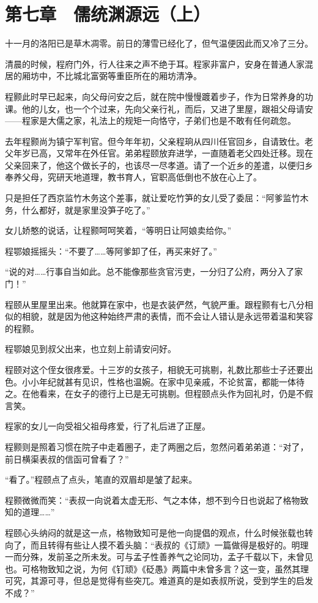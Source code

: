 \section{第七章　儒统渊源远（上）}

十一月的洛阳已是草木凋零。前日的薄雪已经化了，但气温便因此而又冷了三分。

清晨的时候，程府门外，行人往来之声不绝于耳。程家非富户，安身在普通人家混居的厢坊中，不比城北富弼等重臣所在的厢坊清净。

程颢此时早已起来，向父母问安之后，就在院中慢慢踱着步子，作为日常养身的功课。他的儿女，也一个个过来，先向父亲行礼，而后，又进了里屋，跟祖父母请安——程家是大儒之家，礼法上的规矩一向恪守，子弟们也是不敢有任何疏忽。

去年程颢尚为镇宁军判官。但今年年初，父亲程珦从四川任官回乡，自请致仕。老父年岁已高，又常年在外任官。弟弟程颐放弃进学，一直随着老父四处迁移。现在父亲回来了，他这个做长子的，也该尽一尽孝道。请了一个近乡的差遣，以便归乡奉养父母，究研天地道理，教书育人，官职高低倒也不放在心上了。

只是担任了西京监竹木务这个差事，就让爱吃竹笋的女儿受了委屈：“阿爹监竹木务，什么都好，就是家里没笋子吃了。”

女儿娇憨的说话，让程颢呵呵笑着，“等明日让阿娘卖给你。”

程鄂娘摇摇头：“不要了……等阿爹卸了任，再买来好了。”

“说的对……行事自当如此。总不能像那些贪官污吏，一分归了公府，两分入了家门！”

程颐从里屋里出来。他就算在家中，也是衣装俨然，气貌严重。跟程颢有七八分相似的相貌，就是因为他这种始终严肃的表情，而不会让人错认是永远带着温和笑容的程颢。

程鄂娘见到叔父出来，也立刻上前请安问好。

程颐对这个侄女很疼爱。十三岁的女孩子，相貌无可挑剔，礼数比那些士子还要出色。小小年纪就甚有见识，性格也温婉。在家中见亲戚，不论贫富，都能一体待之。在他看来，在女子的德行上已是无可挑剔。但程颐点头作为回礼时，仍是不假言笑。

程家的女儿一向受祖父祖母疼爱，行了礼后进了正屋。

程颢则是照着习惯在院子中走着圈子，走了两圈之后，忽然问着弟弟道：“对了，前日横渠表叔的信函可曾看了？”

“看了。”程颐点了点头，笔直的双眉却是皱了起来。

程颢微微而笑：“表叔一向说着太虚无形、气之本体，想不到今日也说起了格物致知的道理……”

程颐心头纳闷的就是这一点，格物致知可是他一向提倡的观点，什么时候张载也转向了，而且转得有些让人摸不着头脑：“表叔的《订顽》一篇做得是极好的。明理一而分殊，发前圣之所未发。可与孟子性善养气之论同功，孟子千载以下，未曾见也。可格物致知之说，为何《钉顽》《砭愚》两篇中未曾多言？这一变，虽然其理可究，其源可寻，但总是觉得有些突兀。难道真的是如表叔所说，受到学生的启发不成？”

